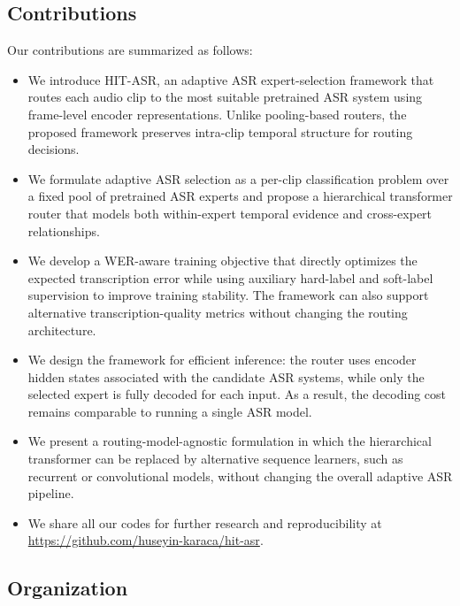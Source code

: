 \documentclass[journal]{IEEEtran}
\begin{document}
\subsection{Contributions}

Our contributions are summarized as follows:

\begin{itemize}

\item We introduce HIT-ASR, an adaptive ASR expert-selection framework that routes each audio clip to the most suitable pretrained ASR system using frame-level encoder representations. Unlike pooling-based routers, the proposed framework preserves intra-clip temporal structure for routing decisions.

\item We formulate adaptive ASR selection as a per-clip classification problem over a fixed pool of pretrained ASR experts and propose a hierarchical transformer router that models both within-expert temporal evidence and cross-expert relationships.

\item We develop a WER-aware training objective that directly optimizes the expected transcription error while using auxiliary hard-label and soft-label supervision to improve training stability. The framework can also support alternative transcription-quality metrics without changing the routing architecture.

\item We design the framework for efficient inference: the router uses encoder hidden states associated with the candidate ASR systems, while only the selected expert is fully decoded for each input. As a result, the decoding cost remains comparable to running a single ASR model.

\item We present a routing-model-agnostic formulation in which the hierarchical transformer can be replaced by alternative sequence learners, such as recurrent or convolutional models, without changing the overall adaptive ASR pipeline.

\item We share all our codes for further research and reproducibility at \url{https://github.com/huseyin-karaca/hit-asr}.

\end{itemize}


\subsection{Organization}
\end{document}

